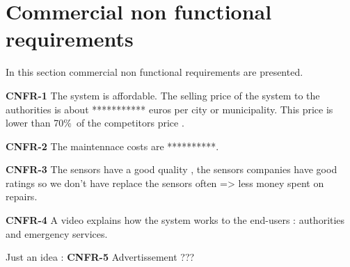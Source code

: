 \section{Commercial non functional requirements}
 In this section commercial non functional requirements are presented.
 
\textbf{CNFR-1} The system is affordable.
The selling price of the system to the authorities is about *********** euros per city or municipality. This price is lower than 70\%\ of the competitors price .

\textbf{CNFR-2} The maintennace costs are **********.

\textbf{CNFR-3} The sensors have a good quality , the sensors companies have good ratings so we don't have replace the sensors often => less money spent on repairs.

\textbf{CNFR-4} A video explains how the system works to the end-users : authorities and emergency services.

Just an idea :
\textbf{CNFR-5} Advertissement ???